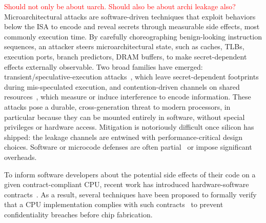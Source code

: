 
\textcolor{red}{Should not only be about uarch. Should also be about archi leakage also?}
Microarchitectural attacks are software-driven techniques that exploit behaviors below the ISA to encode and reveal secrets through measurable side effects, most commonly execution time.
By carefully choreographing benign-looking instruction sequences, an attacker steers microarchitectural state, such as caches, TLBs, execution ports, branch predictors, DRAM buffers, to make secret-dependent effects externally observable.
Two broad families have emerged: transient/speculative-execution attacks~\cite{kocher2019spectre,lipp2018meltdown,armsecure,bhattacharyya2019smotherspectre,van2018foreshadow,canella2019fallout,horn2018speculative,maisuradze2018ret2spec,schwarz2019zombieload,schwarz2019netspectre,stecklina2018lazyfp,van2019ridl,ragab2021crosstalk,van2020lvi,van2021cacheout,ragab2021rage,wikner2022retbleed,trujillo2023inception,wikner2023phantom,wikner2024breaking,wikner2025bpi}, which leave secret-dependent footprints during mis-speculated execution, and contention-driven channels on shared resources~\cite{bernstein2005cache,bonneau2006cache,Liu2015LLC,YaromFalkner2014FlushReload,Gras2018TLBleed,Aldaya2019PortSmash,Yarom2016CacheBleed,Moghimi2018MemJam,Gruss2016PrefetchSCA,Pessl2016DRAMA}, which measure or induce interference to encode information.
These attacks pose a durable, cross-generation threat to modern processors, in particular because they can be mounted entirely in software, without special privileges or hardware access.
Mitigation is notoriously difficult once silicon has shipped: the leakage channels are entwined with performance-critical design choices.
Software or microcode defenses are often partial~\cite{ridlad} or impose significant overheads.

To inform software developers about the potential side effects of their code on a given contract-compliant CPU, recent work has introduced hardware-software contracts~\cite{guarnieri2021hardware,oleksenko2022revizor}.
As a result, several techniques have been proposed to formally verify that a CPU implementation complies with such contracts~\cite{dinesh2024conjunct,dinesh2025h,ceesay2024mucfi,wang2023specification,tan2025contractshadowlogic,hsiao2024rtl2mmupath} to prevent confidentiality breaches before chip fabrication.

